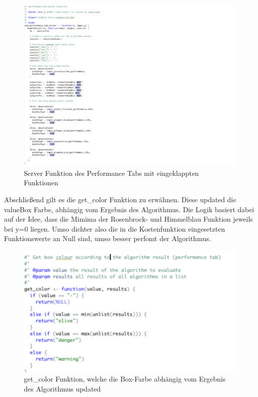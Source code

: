 \begin{figure}[H]
 \centering
 \includegraphics[scale=0.4]{"images/06_Performancevergleich/server_performance_tab.png"}
 \caption{Server Funktion des Performance Tabs mit eingeklappten Funktionen}
 \label{fig:server_performance_tab}
\end{figure}

Abschließend gilt es die get\_color Funktion zu erwähnen. Diese updated die valueBox Farbe, abhängig vom Ergebnis des Algorithmus. Die Logik basiert dabei auf der Idee, dass die Mimima der Rosenbrock- und Himmelblau Funktion jeweils bei y=0 liegen. Umso dichter also die in die Kostenfunktion eingesetzten Funktionswerte an Null sind, umso besser perfomt der Algorithmus. 
\begin{figure}[H]
 \centering
 \includegraphics[scale=0.4]{"images/06_Performancevergleich/utils_get_color.png"}
 \caption{get\_color Funktion, welche die Box-Farbe abhängig vom Ergebnis des Algorithmus updated}
 \label{fig:server_performance_tab}
\end{figure}